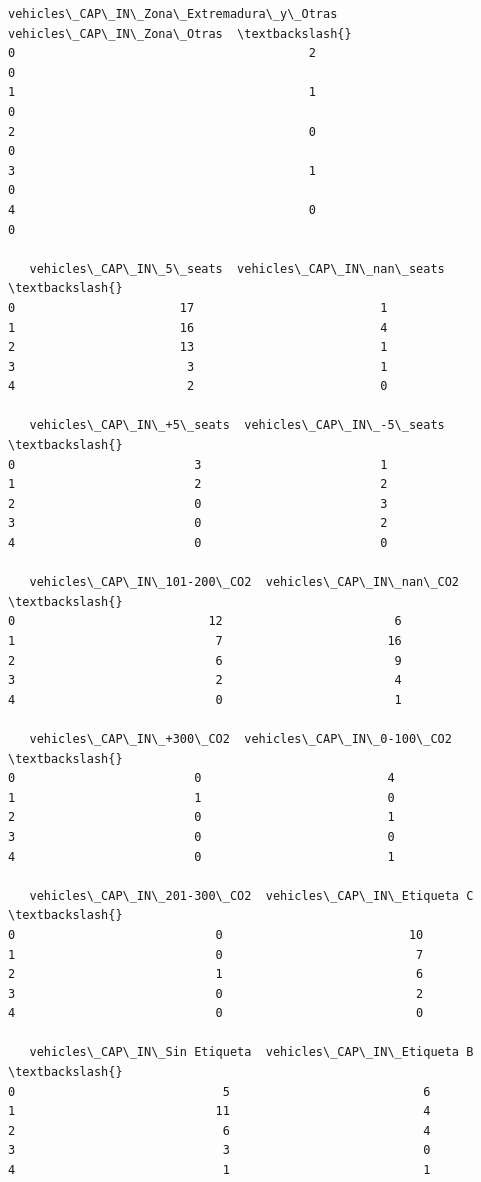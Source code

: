 \documentclass[11pt]{article}
\begin{document}
\begin{tcolorbox}[breakable, size=fbox, boxrule=.5pt, pad at break*=1mm, opacityfill=0]
\begin{Verbatim}[commandchars=\\\{\}]
   vehicles\_CAP\_IN\_Zona\_Extremadura\_y\_Otras  vehicles\_CAP\_IN\_Zona\_Otras  \textbackslash{}
0                                         2                           0
1                                         1                           0
2                                         0                           0
3                                         1                           0
4                                         0                           0

   vehicles\_CAP\_IN\_5\_seats  vehicles\_CAP\_IN\_nan\_seats  \textbackslash{}
0                       17                          1
1                       16                          4
2                       13                          1
3                        3                          1
4                        2                          0

   vehicles\_CAP\_IN\_+5\_seats  vehicles\_CAP\_IN\_-5\_seats  \textbackslash{}
0                         3                         1
1                         2                         2
2                         0                         3
3                         0                         2
4                         0                         0

   vehicles\_CAP\_IN\_101-200\_CO2  vehicles\_CAP\_IN\_nan\_CO2  \textbackslash{}
0                           12                        6
1                            7                       16
2                            6                        9
3                            2                        4
4                            0                        1

   vehicles\_CAP\_IN\_+300\_CO2  vehicles\_CAP\_IN\_0-100\_CO2  \textbackslash{}
0                         0                          4
1                         1                          0
2                         0                          1
3                         0                          0
4                         0                          1

   vehicles\_CAP\_IN\_201-300\_CO2  vehicles\_CAP\_IN\_Etiqueta C  \textbackslash{}
0                            0                          10
1                            0                           7
2                            1                           6
3                            0                           2
4                            0                           0

   vehicles\_CAP\_IN\_Sin Etiqueta  vehicles\_CAP\_IN\_Etiqueta B  \textbackslash{}
0                             5                           6
1                            11                           4
2                             6                           4
3                             3                           0
4                             1                           1


\end{Verbatim}
\end{tcolorbox}
\end{document}
